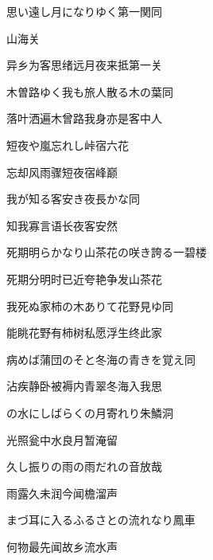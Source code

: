 \begin{haiku}
    {\FH 思い遠し月になりゆく第一関}\hfill{\FH 同}

    {\FK 山海关}

    {\FK 异乡为客思绪远月夜来抵第一关}
\end{haiku}

\begin{haiku}
    {\FH 木曽路ゆく我も旅人散る木の葉}\hfill{\FH 同}

    {\FK 落叶洒遍木曾路我身亦是客中人}
\end{haiku}

\begin{haiku}
    {\FH 短夜や嵐忘れし峠宿}\hfill{\FH 六花}

    {\FK 忘却风雨骤短夜宿峰巅}
\end{haiku}

\begin{haiku}
    {\FH 我が知る客安き夜長かな}\hfill{\FH 同}

    {\FK 知我寡言语长夜客安然}
\end{haiku}

\begin{haiku}
    {\FH 死期明らかなり山茶花の咲き誇る}\hfill{\FH 一碧楼}

    {\FK 死期分明时已近夸艳争发山茶花}
\end{haiku}

\begin{haiku}
    {\FH 我死ぬ家柿の木ありて花野見ゆ}\hfill{\FH 同}

    {\FK 能眺花野有柿树私愿浮生终此家}
\end{haiku}

\begin{haiku}
    {\FH 病めば蒲団のそと冬海の青きを覚え}\hfill{\FH 同}

    {\FK 沾疾静卧被褥内青翠冬海入我思}
\end{haiku}

\begin{haiku}
    {\FH {}の水にしばらくの月寄れり}\hfill{\FH 朱鱗洞}

    {\FK 光照瓮中水良月暂淹留}
\end{haiku}

\begin{haiku}
    {\FH 久し振りの雨の雨だれの音}\hfill{\FH 放哉}

    {\FK 雨露久未润今闻檐溜声}
\end{haiku}

\begin{haiku}
    {\FH まづ耳に入るふるさとの流れなり}\hfill{\FH 鳳車}

    {\FK 何物最先闻故乡流水声}
\end{haiku}

